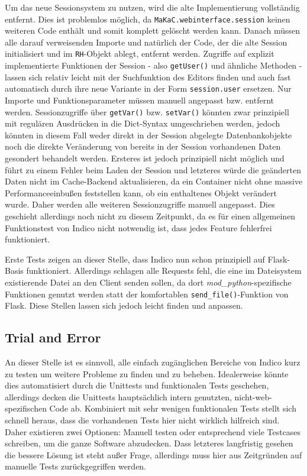 Um das neue Sessionsystem zu nutzen, wird die alte Implementierung vollständig entfernt. Dies ist
problemlos möglich, da \lstinline{MaKaC.webinterface.session} keinen weiteren Code enthält und somit
komplett gelöscht werden kann. Danach müssen alle darauf verweisenden Importe und natürlich der
Code, der die alte Session initialisiert und im \lstinline{RH}-Objekt ablegt, entfernt werden.
Zugriffe auf explizit implementierte Funktionen der Session - also \lstinline{getUser()} und
ähnliche Methoden - lassen sich relativ leicht mit der Suchfunktion des Editors finden und auch fast
automatisch durch ihre neue Variante in der Form \lstinline{session.user} ersetzen. Nur Importe und
Funktionsparameter müssen manuell angepasst bzw. entfernt werden. Sessionzugriffe über
\lstinline{getVar()} bzw. \lstinline{setVar()} könnten zwar prinzipiell mit regulären
Ausdrücken in die Dict-Syntax umgeschrieben werden, jedoch könnten in diesem Fall weder direkt in
der Session abgelegte Datenbankobjekte noch die direkte Veränderung von bereits in der Session
vorhandenen Daten gesondert behandelt werden. Ersteres ist jedoch prinzipiell nicht möglich und
führt zu einem Fehler beim Laden der Session und letzteres würde die geänderten Daten nicht im
Cache-Backend aktualisieren, da ein Container nicht ohne massive Performanceeinbußen feststellen
kann, ob ein enthaltenes Objekt verändert wurde. Daher werden alle weiteren Sessionzugriffe
manuell angepasst. Dies geschieht allerdings noch nicht zu diesem Zeitpunkt, da es für einen
allgemeinen Funktionstest von Indico nicht notwendig ist, dass jedes Feature fehlerfrei
funktioniert.

Erste Tests zeigen an dieser Stelle, dass Indico nun schon prinzipiell auf Flask-Basis funktioniert.
Allerdings schlagen alle Requests fehl, die eine im Dateisystem existierende Datei an den Client
senden sollen, da dort \emph{mod\_python}-spezifische Funktionen genutzt werden statt der
komfortablen \lstinline{send_file()}-Funktion von Flask. Diese Stellen lassen sich jedoch leicht
finden und anpassen.


\subsection{Trial and Error}
An dieser Stelle ist es sinnvoll, alle einfach zugänglichen Bereiche von Indico kurz zu testen um
weitere Probleme zu finden und zu beheben. Idealerweise könnte dies automatisiert durch die
Unittests und funktionalen Tests geschehen, allerdings decken die Unittests hauptsächlich intern
genutzten, nicht-web-spezifischen Code ab. Kombiniert mit sehr wenigen funktionalen Tests stellt
sich schnell heraus, dass die vorhandenen Tests hier nicht wirklich hilfreich sind. Daher existieren
zwei Optionen: Manuell testen oder entsprechend viele Testcases schreiben, um die ganze Software
abzudecken. Dass letzteres langfristig gesehen die bessere Lösung ist steht außer Frage, allerdings
muss hier aus Zeitgründen auf manuelle Tests zurückgegriffen werden.

